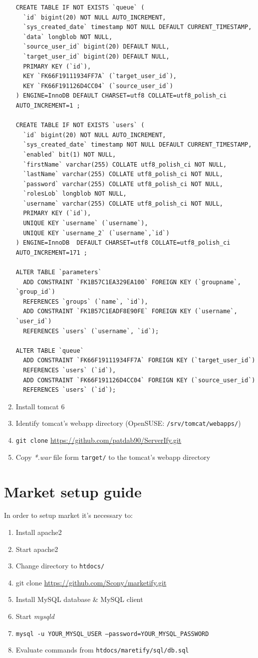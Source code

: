 \documentclass[11pt,a4paper,polish,thesis]{dcsbook}
\begin{document}
\begin{enumerate}
\begin{verbatim}
CREATE TABLE IF NOT EXISTS `queue` (
  `id` bigint(20) NOT NULL AUTO_INCREMENT,
  `sys_created_date` timestamp NOT NULL DEFAULT CURRENT_TIMESTAMP,
  `data` longblob NOT NULL,
  `source_user_id` bigint(20) DEFAULT NULL,
  `target_user_id` bigint(20) DEFAULT NULL,
  PRIMARY KEY (`id`),
  KEY `FK66F19111934FF7A` (`target_user_id`),
  KEY `FK66F191126D4CC04` (`source_user_id`)
) ENGINE=InnoDB DEFAULT CHARSET=utf8 COLLATE=utf8_polish_ci AUTO_INCREMENT=1 ;
 
CREATE TABLE IF NOT EXISTS `users` (
  `id` bigint(20) NOT NULL AUTO_INCREMENT,
  `sys_created_date` timestamp NOT NULL DEFAULT CURRENT_TIMESTAMP,
  `enabled` bit(1) NOT NULL,
  `firstName` varchar(255) COLLATE utf8_polish_ci NOT NULL,
  `lastName` varchar(255) COLLATE utf8_polish_ci NOT NULL,
  `password` varchar(255) COLLATE utf8_polish_ci NOT NULL,
  `rolesLob` longblob NOT NULL,
  `username` varchar(255) COLLATE utf8_polish_ci NOT NULL,
  PRIMARY KEY (`id`),
  UNIQUE KEY `username` (`username`),
  UNIQUE KEY `username_2` (`username`,`id`)
) ENGINE=InnoDB  DEFAULT CHARSET=utf8 COLLATE=utf8_polish_ci AUTO_INCREMENT=171 ;
 
ALTER TABLE `parameters`
  ADD CONSTRAINT `FK1B57C1EA329EA100` FOREIGN KEY (`groupname`, `group_id`)
  REFERENCES `groups` (`name`, `id`),
  ADD CONSTRAINT `FK1B57C1EADF8E90FE` FOREIGN KEY (`username`, `user_id`)
  REFERENCES `users` (`username`, `id`);
 
ALTER TABLE `queue`
  ADD CONSTRAINT `FK66F19111934FF7A` FOREIGN KEY (`target_user_id`)
  REFERENCES `users` (`id`),
  ADD CONSTRAINT `FK66F191126D4CC04` FOREIGN KEY (`source_user_id`)
  REFERENCES `users` (`id`);

\end{verbatim}
\item Install tomcat 6
\item Identify tomcat's webapp directory (OpenSUSE: \texttt{/srv/tomcat/webapps/})
\item \texttt{git clone} \url{https://github.com/patdab90/ServerIfy.git}
\item Copy \emph{*.war} file form \texttt{target/} to the tomcat's webapp directory
\end{enumerate}

\chapter{Market setup guide}
In order to setup market it's necessary to:
\begin{enumerate}
\item Install apache2
\item Start apache2
\item Change directory to \texttt{htdocs/}
\item git clone \url{https://github.com/Scony/marketify.git}
\item Install MySQL database \& MySQL client
\item Start \emph{mysqld}
\item \texttt{mysql -u YOUR\_MYSQL\_USER --password=YOUR\_MYSQL\_PASSWORD}
\item Evaluate commands from \texttt{htdocs/maretify/sql/db.sql}
\end{enumerate}
\end{document}
